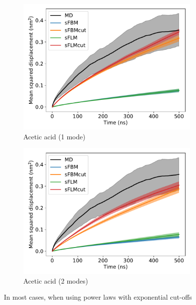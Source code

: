 \documentclass[12pt]{article}
\begin{document}
\begin{figure}
\begin{subfigure}{0.45\textwidth}
  \includegraphics[width=\textwidth]{1mode_msd_comparison_ACH_train_front.pdf}
  \caption{Acetic acid (1 mode)}\label{fig:1mode_msd_comparison_ACH_train_front}
  \end{subfigure}
  \begin{subfigure}{0.45\textwidth}
  \includegraphics[width=\textwidth]{2mode_msd_comparison_ACH_train_front.pdf}
  \caption{Acetic acid (2 modes)}\label{fig:2mode_msd_comparison_ACH_train_front}
  \end{subfigure} 
  \caption{In most cases, when using power laws with exponential cut-offs 
}
\end{figure}
\end{document}
